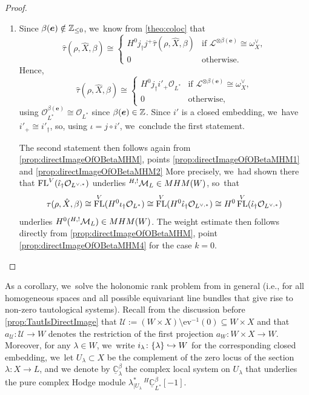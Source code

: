 \documentclass[11pt]{article}
\newcommand{\ie}{i.e.,\xspace}
\let\mathds\mathbb
\newcommand\hto{\mathrel{\lhook\joinrel\to}}
\newcommand{\bme}{{\boldsymbol{e}}}
\newcommand{\ev}{\mathrm{ev}}
\newcommand{\dC}{{\mathds C}}\let\C\dC
\newcommand{\Ell}{\mathscr{L}}
\newcommand{\cM}{\mathcal{M}}
\newcommand{\cO}{\mathcal{O}}\let\O\cO
\newcommand{\cU}{\mathcal{U}}\let\mcu\cU
\DeclareMathOperator{\FL}{\textup{FL}}
\newcommand{\MHM}{\textup{MHM}}
\begin{document}
\begin{proof}
\begin{enumerate}
\item Since $\beta(\bme) \notin \Z_{\leq 0}$, we~know from \cref{theo:coloc} that
\[
\hat\tau(\rho, \hat X, \beta) \cong 
\begin{cases} H^0 j_\dag j^+ \hat\tau(\rho, \hat X, \beta) &\text{if } \Ell^{\otimes \beta(\bme)} \cong \omega_X^\vee, \\
0 & \text{otherwise.}
\end{cases}
\]
Hence,
\[
\hat\tau(\rho, \hat X, \beta) \cong 
\begin{cases} H^0 j_\dag i'_+ \O_{L^*} &\text{if } \Ell^{\otimes \beta(\bme)} \cong \omega_X^\vee, \\
0 & \text{otherwise,}
\end{cases}
\]
using $\O_{L^*}^{\beta(\bme)} \cong \O_{L^*}$ since $\beta(\bme) \in \Z$. Since $i'$ is a closed embedding, we~have $i'_+ \cong i'_\dag$, so, using $\iota = j \circ i'$, we~conclude the first statement.

The second statement then follows again from \cref{prop:directImageOfOBetaMHM}, points \eqref{prop:directImageOfOBetaMHM1} and \eqref{prop:directImageOfOBetaMHM2} More precisely, we~had shown there that $\FL^V(\hat{\iota}_\dag \cO_{L^{\vee,*}})$ underlies ${^{H,!}}\cM_L\in\MHM(W)$, so~that
\[
\tau(\rho,\hat{X},\beta)
\cong
\FL^V(H^0 \iota_\dag \cO_{L^*})
\cong
\FL^V(H^0 \hat{\iota}_\dag \cO_{L^{\vee,*}})
\cong
H^0\FL^V(\hat{\iota}_\dag \cO_{L^{\vee,*}})
\]
underlies $H^0({^{H,!}}\cM_L)\in\MHM(W)$. The weight estimate then follows directly from \cref{prop:directImageOfOBetaMHM}, point \eqref{prop:directImageOfOBetaMHM4} for the case $k=0$. \qedhere
\end{enumerate}
\end{proof}

As a corollary, we~solve the holonomic rank problem from \cite[Conj.\,1.3.]{Bloch_HolRankProb} in general (\ie for all homogeneous spaces and all possible equivariant line bundles that give rise to non-zero tautological systems). Recall from the discussion before \cref{prop:TautIsDirectImage} that $\cU:=(W\times X) \setminus \ev^{-1}(0) \subseteq W\times X$ and that $a_\cU\colon \cU\to W$ denotes the restriction of the first projection $a_W \colon W\times X\to W$.
Moreover, for any $\lambda\in W$, we~write $i_\lambda \colon \{\lambda\}\hto W$ for the corresponding closed embedding, we~let $U_\lambda\subset X$ be the complement of the zero locus of the section $\lambda \colon X\to L$, and we denote by $\underline{\dC}^\beta_\lambda$ the complex local system on $U_\lambda$ that underlies the pure complex Hodge module $\lambda^*_{|U_\lambda}\, ^{H\!}\underline{\dC}^\beta_{L^*}[-1]$.
\end{document}
